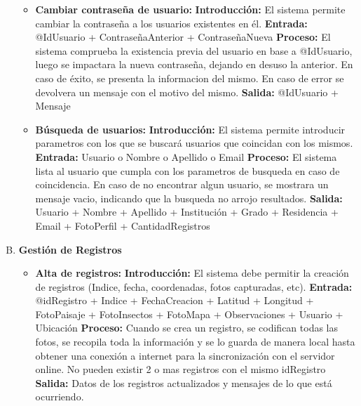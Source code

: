 \begin{enumerate}[A.]
\begin{itemize}
            \item \textbf{Cambiar contraseña de usuario:}
                \tab\textbf{Introducción:} El sistema permite cambiar la contraseña a los usuarios existentes en él.
                \tab\textbf{Entrada:} @IdUsuario + ContraseñaAnterior + ContraseñaNueva
                \tab\textbf{Proceso:} El sistema comprueba la existencia previa del usuario en base a @IdUsuario, luego se impactara la nueva contraseña, dejando en desuso la anterior. En caso de éxito, se presenta la informacion del mismo. En caso de error se devolvera un mensaje con el motivo del mismo.
                \tab\textbf{Salida:} @IdUsuario + Mensaje

            \item \textbf{Búsqueda de usuarios:}
                \tab\textbf{Introducción:} El sistema permite introducir parametros con los que se buscará usuarios que coincidan con los mismos.
                \tab\textbf{Entrada:} Usuario o Nombre o Apellido o Email
                \tab\textbf{Proceso:} El sistema lista al usuario que cumpla con los parametros de busqueda en caso de coincidencia. En caso de no encontrar algun usuario, se mostrara un mensaje vacio, indicando que la busqueda no arrojo resultados.
                \tab\textbf{Salida:} Usuario + Nombre + Apellido + Institución + Grado + Residencia + Email + FotoPerfil + CantidadRegistros
        
        \end{itemize}


    \item \textbf{Gestión de Registros}
        \begin{itemize}  
            \item \textbf{Alta de registros:}
                \tab\textbf{Introducción:} El sistema debe permitir la  creación de registros (Indice, fecha, coordenadas, fotos capturadas, etc). 
                \tab\textbf{Entrada:} @idRegistro + Indice + FechaCreacion + Latitud + Longitud + FotoPaisaje + FotoInsectos + FotoMapa + Observaciones + Usuario + Ubicación 
                \tab\textbf{Proceso:} Cuando se crea un registro, se codifican todas las fotos, se recopila toda la información y se lo guarda de manera local hasta obtener una conexión a internet para la sincronización con el servidor online.
                No pueden existir 2 o mas registros con el mismo idRegistro
                \tab\textbf{Salida:} Datos de los registros actualizados y mensajes de lo que está ocurriendo.


\end{itemize}
\end{enumerate}
